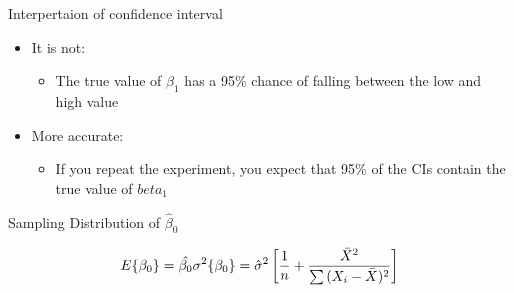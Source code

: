 \documentclass[
  ignorenonframetext,
]{beamer}
\newenvironment{Shaded}{\begin{snugshade}}{\end{snugshade}}
\newcommand{\DecValTok}[1]{\textcolor[rgb]{0.00,0.00,0.81}{#1}}
\newcommand{\KeywordTok}[1]{\textcolor[rgb]{0.13,0.29,0.53}{\textbf{#1}}}
\newcommand{\NormalTok}[1]{#1}
\newcommand{\OperatorTok}[1]{\textcolor[rgb]{0.81,0.36,0.00}{\textbf{#1}}}
\newcommand{\StringTok}[1]{\textcolor[rgb]{0.31,0.60,0.02}{#1}}
\providecommand{\tightlist}{%
  \setlength{\itemsep}{0pt}\setlength{\parskip}{0pt}}
\begin{document}
\begin{frame}{Interpertaion of confidence interval}
\protect\hypertarget{interpertaion-of-confidence-interval}{}

\begin{itemize}
\tightlist
\item
  It is not:

  \begin{itemize}
  \tightlist
  \item
    The true value of \(\beta_1\) has a 95\% chance of falling between
    the low and high value
  \end{itemize}
\item
  More accurate:

  \begin{itemize}
  \tightlist
  \item
    If you repeat the experiment, you expect that 95\% of the CIs
    contain the true value of \(beta_1\)
  \end{itemize}
\end{itemize}

\end{frame}

\begin{frame}[fragile]{Sampling Distribution of \(\hat\beta_0\)}
\protect\hypertarget{sampling-distribution-of-hatbeta_0}{}

\[
E\{\beta_0\} = \hat{\beta_0} \\
\sigma^2\{\beta_0\} = \hat\sigma^2  \left[\frac{1}{n} +  \frac{\bar{X}^2}{\sum{(X_i - \bar{X})^2}} \right]
\]

\begin{Shaded}
\end{Shaded}

\end{frame}
\end{document}
